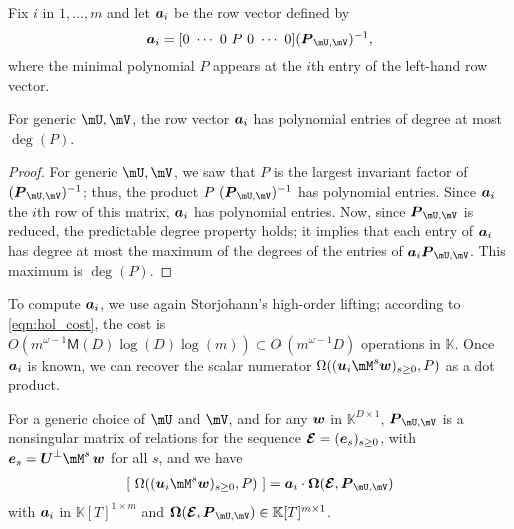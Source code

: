 \documentclass[12pt]{article}
\newcommand{\var}{T} %
\newcommand{\mat}[1]{\bm{\MakeUppercase{#1}}} %
\newcommand{\row}[1]{\bm{\MakeLowercase{#1}}} %
\newcommand{\col}[1]{\bm{\MakeLowercase{#1}}} %
\newcommand{\softO}[1]{O{\tilde{~}}(#1)} %
\newcommand{\minpoly}{P}
\def\M {\ensuremath{\mathsf{M}}}
\def\K{\mathbb{K}}
\def\K {\ensuremath{\mathbb{K}}}
\begin{document}
Fix $i$ in $1,\dots,m$ and let $\row{a}_i$ be the row vector defined
by $$\row{a}_i =[0~\cdots~0~\minpoly~0~\cdots~0]  (\mat{P}_{\mU,\mV})^{-1} ,$$
where the minimal polynomial $\minpoly$ appears at the $i$th entry  of the
left-hand row vector. 
\begin{lemma}\label{utilde}
  For generic $\mU,\mV$, the row vector $\row{a}_i$ has polynomial
  entries of degree at most~$\deg(P)$.
\end{lemma}
\begin{proof}
  For generic $\mU,\mV$, we saw that $\minpoly$ is the largest invariant factor
  of $ (\mat{P}_{\mU,\mV})^{-1}$; thus, the product $\minpoly\
  (\mat{P}_{\mU,\mV})^{-1}$ has polynomial entries. Since $\row{a}_i$ the $i$th
  row of this matrix, $\row{a}_i$ has polynomial entries.  Now, since
  $\mat{P}_{\mU,\mV}$ is reduced, the predictable degree property
  \cite[Theorem~6.3-13]{Kailath80} holds; it implies that each entry of
  $\row{a}_i$ has degree at most the maximum of the degrees of the entries of
  $\row{a}_i\mat{P}_{\mU,\mV}$. This maximum is $\deg(\minpoly)$.
\end{proof}
To compute $\row{a}_i$, we use again Storjohann's high-order lifting;
according to \cref{eqn:hol_cost}, the cost is
$ O(m^{\omega-1} \M(D) \log(D) \log(m)) \subset \softO{m^{\omega-1}D}$ operations in $\K$.
Once $\row{a}_i$ is known, we can recover the scalar numerator
$\Omega((\row{u}_i \mM^s \col{w})_{s \ge 0}, \minpoly)$ as
a dot product. 
\begin{lemma}\label{lemma:omegaOmega}
  For a generic choice of $\mU$ and $\mV$, and for any $\col{w}$ in
  $\K^{D \times 1}$, $ \mat{P}_{\mU,\mV}$ is a nonsingular matrix of
  relations for the sequence $\mat{\mathcal{E}} =
  (\col{e}_s)_{s\ge0}$, with $\col{e}_s=\mat{U}^\perp \mM^s\, \col{w}$
  for all $s$, and we have
\begin{align}\label{eq:OmegaOmega}
[~\Omega((\row{u}_i \mM^s \col{w})_{s \ge 0}, \minpoly)~] = \row{a}_i\cdot \mat{\Omega}(\mat{\mathcal{E}}, \mat{P}_{\mU,\mV})
\end{align}
with $\row{a}_i$ in $\K[\var]^{1 \times m}$ and 
$\mat{\Omega}(\mat{\mathcal{E}} , \mat{P}_{\mU,\mV}) \in \K[\var]^{m \times 1}$.
\end{lemma}
\end{document}
